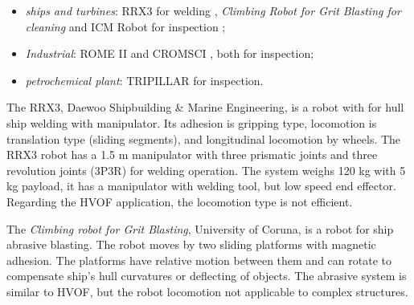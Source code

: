 \begin{itemize}
  \item \emph {ships and turbines}: RRX3 for welding
   \citep{rrx3}, \emph{Climbing Robot for Grit Blasting for cleaning}
   \citep{crgb} and ICM Robot for inspection \citep{icm};
  \item \emph{Industrial}: ROME II \citep{roma} and CROMSCI \citep{CROMSCI}, both for inspection;
  \item \emph{petrochemical plant}: TRIPILLAR \citep{tripillar} for inspection.
\end{itemize}

The RRX3, Daewoo Shipbuilding \& Marine Engineering, is a
robot with for hull ship welding with manipulator. Its adhesion is gripping
type, locomotion is translation type (sliding segments), and longitudinal locomotion by wheels.
The RRX3 robot has a 1.5 m manipulator with three prismatic joints and three
revolution joints  (3P3R) for welding operation. The system weighs 120 kg with 5
kg payload, it has a manipulator with welding tool, but low speed end effector.
Regarding the HVOF application, the locomotion type is not efficient.



The \emph{Climbing robot for Grit Blasting}, %
University of Coruna, is a robot for ship abrasive blasting. The robot moves by
two sliding platforms with magnetic adhesion. The platforms have relative motion
between them and can rotate to compensate ship's hull curvatures or
deflecting of objects. The abrasive system is similar to HVOF, but the robot
locomotion not applicable to complex structures.


